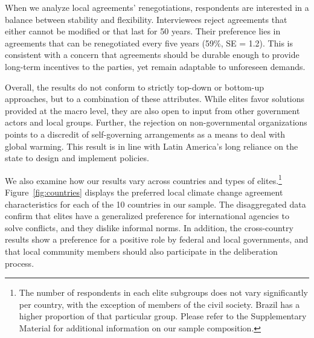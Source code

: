 \documentclass[a4paper,12pt]{article}
\begin{document}
When we analyze local agreements' renegotiations, respondents are interested in a balance between stability and flexibility. Interviewees reject agreements that either cannot be modified or that last for 50 years. Their preference lies in agreements that can be renegotiated every five years (59\%, SE = 1.2). This is consistent with a concern that agreements should be durable enough to provide long-term incentives to the parties, yet remain adaptable to unforeseen demands.

Overall, the results do not conform to strictly top-down or bottom-up approaches, but to a combination of these attributes. While elites favor solutions provided at the macro level, they are also open to input from other government actors and local groups. Further, the rejection on non-governmental organizations points to a discredit of self-governing arrangements as a means to deal with global warming. This result is in line with Latin America's long reliance on the state to design and implement policies.

We also examine how our results vary across countries and types of elites.\footnote{The number of respondents in each elite subgroups does not vary significantly per country, with the exception of members of the civil society. Brazil has a higher proportion of that particular group. Please refer to the Supplementary Material for additional information on our sample composition.} Figure~\ref{fig:countries} displays the preferred local climate change agreement characteristics for each of the 10 countries in our sample. The disaggregated data confirm that elites have a generalized preference for international agencies to solve conflicts, and they dislike informal norms. In addition, the cross-country results show a preference for a positive role by federal and local governments, and that local community members should also participate in the deliberation process.
\end{document}
